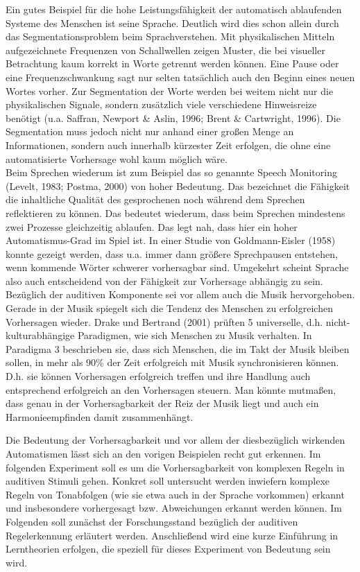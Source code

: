 \documentclass[doc,a4paper,12pt]{apa6}
\begin{document}
Ein gutes Beispiel für die hohe Leistungsfähigkeit der automatisch ablaufenden Systeme des Menschen ist seine Sprache. Deutlich wird dies schon allein durch das Segmentationsproblem beim Sprachverstehen. Mit physikalischen Mitteln aufgezeichnete Frequenzen von Schallwellen zeigen Muster, die bei visueller Betrachtung kaum korrekt in Worte getrennt werden können. Eine Pause oder eine Frequenzschwankung sagt nur selten tatsächlich auch den Beginn eines neuen Wortes vorher. Zur Segmentation der Worte werden bei weitem nicht nur die physikalischen Signale, sondern zusätzlich viele verschiedene Hinweisreize benötigt (u.a. Saffran, Newport \& Aslin, 1996; Brent \& Cartwright, 1996). Die Segmentation muss jedoch nicht nur anhand einer großen Menge an Informationen, sondern auch innerhalb kürzester Zeit erfolgen, die ohne eine automatisierte Vorhersage wohl kaum möglich wäre.\\
Beim Sprechen wiederum ist zum Beispiel das so genannte Speech Monitoring (Levelt, 1983; Postma, 2000) von hoher Bedeutung. Das bezeichnet die Fähigkeit die inhaltliche Qualität des gesprochenen noch während dem Sprechen reflektieren zu können. Das bedeutet wiederum, dass beim Sprechen mindestens zwei Prozesse gleichzeitig ablaufen. Das legt nah, dass hier ein hoher Automatismus-Grad im Spiel ist. In einer Studie von Goldmann-Eisler (1958) konnte gezeigt werden, dass u.a. immer dann größere Sprechpausen entstehen, wenn kommende Wörter schwerer vorhersagbar sind. Umgekehrt scheint Sprache also auch entscheidend von der Fähigkeit zur Vorhersage abhängig zu sein.\\
Bezüglich der auditiven Komponente sei vor allem auch die Musik hervorgehoben. Gerade in der Musik spiegelt sich die Tendenz des Menschen zu erfolgreichen Vorhersagen wieder. Drake und Bertrand (2001) prüften 5 universelle, d.h. nicht-kulturabhängige Paradigmen, wie sich Menschen zu Musik verhalten. In Paradigma 3 beschrieben sie, dass sich Menschen, die im Takt der Musik bleiben sollen, in mehr als 90\% der Zeit erfolgreich mit Musik synchronisieren können. D.h. sie können Vorhersagen erfolgreich treffen und ihre Handlung auch entsprechend erfolgreich an den Vorhersagen steuern. Man könnte mutmaßen, dass genau in der Vorhersagbarkeit der Reiz der Musik liegt und auch ein Harmonieempfinden damit zusammenhängt.

Die Bedeutung der Vorhersagbarkeit und vor allem der diesbezüglich wirkenden Automatismen lässt sich an den vorigen Beispielen recht gut erkennen. Im folgenden Experiment soll es um die Vorhersagbarkeit von komplexen Regeln in auditiven Stimuli gehen. Konkret soll untersucht werden inwiefern komplexe Regeln von Tonabfolgen (wie sie etwa auch in der Sprache vorkommen) erkannt und insbesondere vorhergesagt bzw. Abweichungen erkannt werden können. Im Folgenden soll zunächst der Forschungsstand bezüglich der auditiven Regelerkennung erläutert werden. Anschließend wird eine kurze Einführung in Lerntheorien erfolgen, die speziell für dieses Experiment von Bedeutung sein wird.
\end{document}
